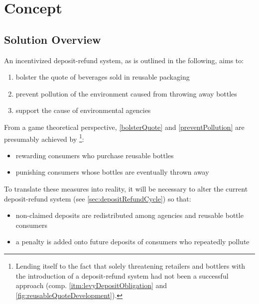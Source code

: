 
\chapter{Concept}
\label{chp:concept}

\section{Solution Overview}



An incentivized deposit-refund system, as is outlined in the following, aims to:

\begin{enumerate}[label=(\Alph*)]
  \item \label{bolsterQuote} bolster the quote of beverages sold in reusable packaging
  \item \label{preventPollution} prevent pollution of the environment caused from throwing away bottles
  \item support the cause of environmental agencies
\end{enumerate}

From a game theoretical perspective, \ref{bolsterQuote} and \ref{preventPollution} are presumably achieved by \footnote{Lending itself to the fact that solely threatening retailers and bottlers with the introduction of a deposit-refund system had not been a successful approach (comp. \ref{itm:levyDepositObligation} and \autoref{fig:reusableQuoteDevelopment}).}:

\begin{itemize}
  \item rewarding consumers who purchase reusable bottles
  \item punishing consumers whose bottles are eventually thrown away
\end{itemize}

To translate these measures into reality, it will be necessary to alter the current deposit-refund system (see \ref{sec:depositRefundCycle}) so that:

\begin{itemize}
  \item non-claimed deposits are redistributed among agencies and reusable bottle consumers
  \item a penalty is added onto future deposits of consumers who repeatedly pollute
\end{itemize}

